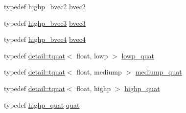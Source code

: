 \begin{DoxyCompactItemize}
typedef \hyperlink{group__core__precision_ga4153415d1f3d390219ac9464652ac377}{highp\+\_\+bvec2} \hyperlink{group__core__types_ga7523cf292181cf7daef3aa0a3267d8e3}{bvec2}
\item 
typedef \hyperlink{group__core__precision_ga1d77a773fdd024602413670788c10c62}{highp\+\_\+bvec3} \hyperlink{group__core__types_ga3f07d6d37fc6fe875170fd5799685bcf}{bvec3}
\item 
typedef \hyperlink{group__core__precision_ga381539af52c5e5c659700e12fb706eaf}{highp\+\_\+bvec4} \hyperlink{group__core__types_ga6bb211b3d3bebae3867548d5673ca5cd}{bvec4}
\item 
typedef \hyperlink{structglm_1_1detail_1_1tquat}{detail\+::tquat}$<$ float, lowp $>$ \hyperlink{namespaceglm_aefc1d896fa40939955d68b2c68c33cc8}{lowp\+\_\+quat}
\item 
typedef \hyperlink{structglm_1_1detail_1_1tquat}{detail\+::tquat}$<$ float, mediump $>$ \hyperlink{namespaceglm_aa891775f83d9da605b5dd0dc34a3ef62}{mediump\+\_\+quat}
\item 
typedef \hyperlink{structglm_1_1detail_1_1tquat}{detail\+::tquat}$<$ float, highp $>$ \hyperlink{namespaceglm_a8d2836172e6561f6519c39d0b5d025c1}{highp\+\_\+quat}
\item 
typedef \hyperlink{namespaceglm_a8d2836172e6561f6519c39d0b5d025c1}{highp\+\_\+quat} \hyperlink{namespaceglm_ac1f6a5957091b849730ea6f05a6b7ad6}{quat}\hypertarget{namespaceglm_ac1f6a5957091b849730ea6f05a6b7ad6}{}\label{namespaceglm_ac1f6a5957091b849730ea6f05a6b7ad6}


\end{DoxyCompactItemize}
